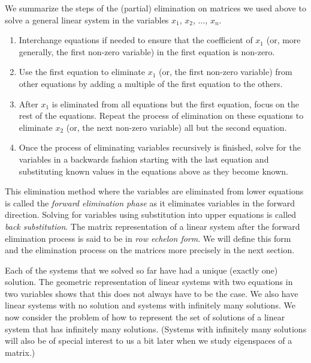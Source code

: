 We summarize the steps of the (partial) elimination on matrices we used above to solve a general linear system in the variables $x_1$, $x_2$, $\ldots$, $x_n$.
\begin{enumerate}
\item Interchange equations if needed to ensure that the coefficient of $x_1$ (or, more generally, the first non-zero variable) in the first equation is non-zero.
\item Use the first equation to eliminate $x_1$ (or, the first non-zero variable) from other equations by adding a multiple of the first equation to the others.
\item After $x_1$ is eliminated from all equations but the first equation, focus on the rest of the equations. Repeat the process of elimination on these equations to eliminate $x_2$  (or, the next non-zero variable) all but the second equation. 
\item Once the process of eliminating variables recursively is finished, solve for the variables in a backwards fashion starting with the last equation and substituting known values in the equations above as they become known.
\end{enumerate}
This elimination method where the variables are eliminated from lower equations is called the \emph{forward elimination phase} as it eliminates variables in the forward direction. Solving for variables using substitution into upper equations is called \emph{back substitution}. The matrix representation of a linear system after the forward elimination process is said to be in \emph{row echelon form}. We will define this form and the elimination process on the matrices more precisely in the next section.


Each of the systems that we solved so far have had a unique (exactly one) solution. The geometric representation of linear systems with two equations in two variables shows that this does not always have to be the case. We also have linear systems with no solution and systems with infinitely many solutions. We now consider the problem of how to represent the set of solutions of a linear system that has infinitely many solutions. (Systems with infinitely many solutions will also be of special interest to us a bit later when we study eigenspaces of a matrix.)



